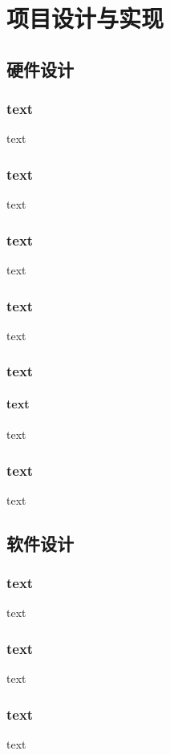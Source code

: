 
\section{项目设计与实现}

\subsection{硬件设计}

\subsubsection{text}
text
\subsubsection{text}
text
\subsubsection{text}
text
\subsubsection{text}
text
\subsubsection{text}
\paragraph{text}
text
\subsubsection{text}
text

\subsection{软件设计}
\subsubsection{text}
text
\subsubsection{text}
text
\subsubsection{text}
text





